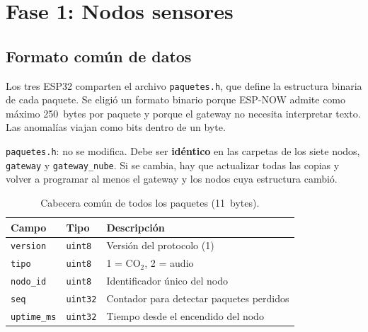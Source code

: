 \documentclass[11pt,a4paper]{article}
\newcommand{\arch}[1]{\texttt{#1}}
\begin{document}
\section{Fase 1: Nodos sensores}

\subsection{Formato com\'un de datos}

Los tres ESP32 comparten el archivo \arch{paquetes.h}, que define la estructura binaria de
cada paquete. Se eligi\'o un formato binario porque ESP-NOW admite como m\'aximo 250~bytes
por paquete y porque el gateway no necesita interpretar texto. Las anomal\'ias viajan como
bits dentro de un byte.

\begin{completar}
\arch{paquetes.h}: no se modifica. Debe ser \textbf{id\'entico} en las carpetas de los siete
nodos, \arch{gateway} y \arch{gateway\_nube}. Si se cambia, hay que actualizar todas las copias y
volver a programar al menos el gateway y los nodos cuya estructura cambi\'o.
\end{completar}

\begin{table}[H]
\centering
\caption{Cabecera com\'un de todos los paquetes (11~bytes).}
\begin{tabular}{@{}lll@{}}
\toprule
\textbf{Campo} & \textbf{Tipo} & \textbf{Descripci\'on} \\
\midrule
\texttt{version} & \texttt{uint8} & Versi\'on del protocolo (1) \\
\texttt{tipo} & \texttt{uint8} & 1 = CO$_2$, 2 = audio \\
\texttt{nodo\_id} & \texttt{uint8} & Identificador \'unico del nodo \\
\texttt{seq} & \texttt{uint32} & Contador para detectar paquetes perdidos \\
\texttt{uptime\_ms} & \texttt{uint32} & Tiempo desde el encendido del nodo \\
\bottomrule
\end{tabular}
\end{table}
\end{document}
